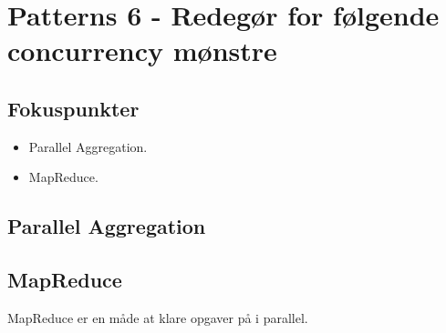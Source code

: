 \section{Patterns 6 - Redegør for følgende concurrency mønstre}

\subsection{Fokuspunkter}

\begin{itemize}
	\item Parallel Aggregation.
	\item MapReduce.
\end{itemize}

\subsection{Parallel Aggregation}

\subsection{MapReduce}
MapReduce er en måde at klare opgaver på i parallel. 